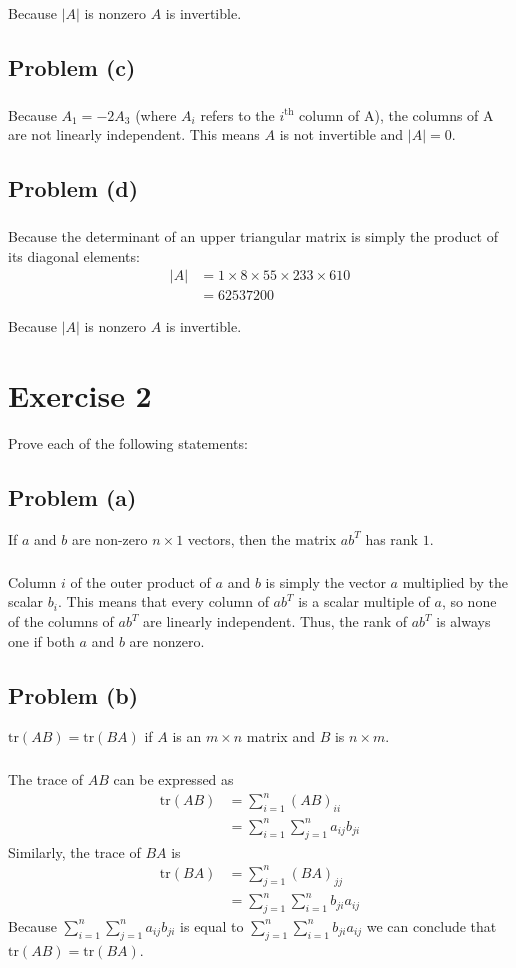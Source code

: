 \documentclass[11pt]{article}
\begin{document}
Because $|A|$ is nonzero $A$ is invertible.

\subsection*{Problem (c)}

\subparagraph*{}

Because $A_1 = -2A_3$ (where $A_i$ refers to the $i^\text{th}$ column of A), the columns of A are not linearly independent. This means $A$ is not invertible and $|A| = 0$.

\subsection*{Problem (d)}

\subparagraph*{}

Because the determinant of an upper triangular matrix is simply the product of its diagonal elements:
\begin{align*}
	|A| &= 1 \times 8 \times 55 \times 233 \times 610 \\
	&= 62537200
\end{align*}

Because $|A|$ is nonzero $A$ is invertible.

\section*{Exercise 2}
Prove each of the following statements:
\subsection*{Problem (a)}
If $a$ and $b$ are non-zero $n\times 1$ vectors, then the matrix $ab^T$ has rank $1$.
\subparagraph*{}
Column $i$ of the outer product of $a$ and $b$ is simply the vector $a$ multiplied by the scalar $b_i$. This means that every column of $ab^T$ is a scalar multiple of $a$, so none of the columns of $ab^T$ are linearly independent. Thus, the rank of $ab^T$ is always one if both $a$ and $b$ are nonzero.
\subsection*{Problem (b)}
$\text{tr}(AB) = \text{tr}(BA)$ if $A$ is an $m\times n$ matrix and $B$ is $n\times m$.
\subparagraph*{}
The trace of $AB$ can be expressed as 
\begin{align*}
	\text{tr}(AB) &= \sum_{i=1}^n(AB)_{ii} \\
	&= \sum_{i=1}^n \sum_{j=1}^n a_{ij}b_{ji}
\end{align*} 
Similarly, the trace of $BA$ is
\begin{align*}
	\text{tr}(BA) &= \sum_{j=1}^n(BA)_{jj} \\
	&= \sum_{j=1}^n \sum_{i=1}^n b_{ji}a_{ij}
\end{align*}
Because $\sum_{i=1}^n \sum_{j=1}^n a_{ij}b_{ji}$ is equal to $\sum_{j=1}^n \sum_{i=1}^n b_{ji}a_{ij}$ we can conclude that $\text{tr}(AB) = \text{tr}(BA)$.
\end{document}
